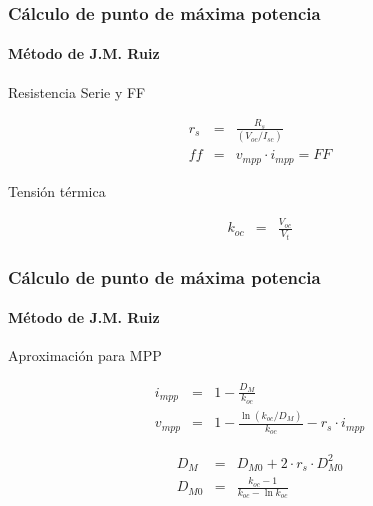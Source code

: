 \documentclass[xcolor=dvipsnames]{beamer}
\begin{document}
\begin{frame}
  \frametitle{Cálculo de punto de máxima potencia}


  \framesubtitle{Método de J.M. Ruiz}
  \begin{block} {Resistencia Serie y FF}

\begin{eqnarray*}
  r_{s} & = & \frac{R_{s}}{(V_{oc}/I_{sc})}\\
  ff & = & v_{mpp}\cdot i_{mpp}=FF\end{eqnarray*}


\end{block} {}
\begin{block} {Tensión térmica}

\begin{eqnarray*}
  k_{oc} & = & \frac{V_{oc}}{V_{t}}\end{eqnarray*}


\end{block}

\end{frame}

\begin{frame}
  \frametitle{Cálculo de punto de máxima potencia}


  \framesubtitle{Método de J.M. Ruiz}
  \begin{block} {Aproximación para MPP}

\begin{eqnarray*}
  i_{mpp} & = & 1-\frac{D_{M}}{k_{oc}}\\
  v_{mpp} & = & 1-\frac{\ln(k_{oc}/D_{M})}{k_{oc}}-r_{s}\cdot i_{mpp}\end{eqnarray*}
 

\begin{eqnarray*}
  D_{M} & = & D_{M0}+2\cdot r_{s}\cdot D_{M0}^{2}\\
  D_{M0} & = & \frac{k_{oc}-1}{k_{oc}-\ln k_{oc}}\end{eqnarray*}


\end{block}

\end{frame}
\end{document}
